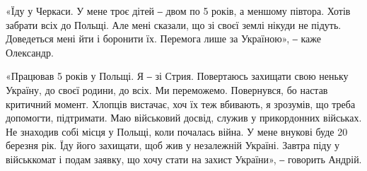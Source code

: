 «Їду у Черкаси. У мене троє дітей ‒ двом по 5 років, а меншому півтора. Хотів
забрати всіх до Польщі. Але мені сказали, що зі своєї землі нікуди не підуть.
Доведеться мені йти і боронити їх. Перемога лише за Україною», ‒ каже
Олександр.

«Працював 5 років у Польщі. Я ‒ зі Стрия. Повертаюсь захищати свою неньку
Україну, до своєї родини, до всіх. Ми переможемо. Повернувся, бо настав
критичний момент. Хлопців вистачає, хоч їх теж вбивають, я зрозумів, що треба
допомогти, підтримати. Маю військовий досвід, служив у прикордонних військах.
Не знаходив собі місця у Польщі, коли почалась війна. У мене внукові буде 20
березня рік. Їду його захищати, щоб жив у незалежній Україні. Завтра піду у
військкомат і подам заявку, що хочу стати на захист України», ‒ говорить
Андрій.

